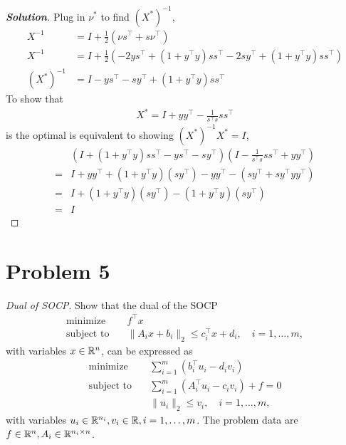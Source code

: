 \documentclass[11pt]{article}
\newenvironment{solution}
  {\renewcommand\qedsymbol{$\square$}\begin{proof}[\textbf{Solution}]}
  {\end{proof}}
\newcommand{\T}{^\top}          %
\begin{document}
\begin{solution}
Plug in $\nu^*$ to find $(X^*)^{-1}$, 
\begin{align*}
    X^{-1} &= I + \frac{1}{2} (\nu s^\top + s \nu^\top) \\
    X^{-1} &= I + \frac{1}{2} \left(-2y s^\top + (1 + y^\top y) s s^\top - 2s y^\top + (1 + y^\top y) s s^\top \right) \\
    (X^*)^{-1} &= 
    I - y s^\top - sy^\top + (1 + y^\top y) s s^\top
\end{align*}
To show that 
\begin{align*}
    X^* = I + yy^\top - \frac{1}{s^\top s} s s^\top
\end{align*}
is the optimal is equivalent to showing $(X^*)^{-1} X^* = I$, 
\begin{align*}
    & \left( I + (1 + y^\top y) s s^\top - y s^\top - sy^\top \right) 
    \left( I - \frac{1}{s^\top s}s s^\top + yy^\top\right) \\
    =& I + yy^\top 
    + (1 + y^\top y) (s y^\top) 
    - y y^\top
    - (sy^\top + s y^\top y y^\top) \\ 
    =& I + (1 + y^\top y) (s y^\top) - (1+ y^\top y )(sy^\top) \\ 
    =& I
\end{align*}

\end{solution}

\clearpage
\section*{Problem 5}
\textit{Dual of SOCP}. Show that the dual of the SOCP
\begin{align*}
  \text{minimize} \quad & f\T x\\
  \text{subject to} \quad & \|A_i x + b_i\|_2 \leq c_i\T x + d_i, \quad i = 1, \dots, m,
\end{align*}
with variables $x\in{{\mathbb{R}}}^n$, can be expressed as 
\begin{align*}
  \text{minimize} \quad & \sum_{i=1}^{m} (b_i\T u_i - d_i v_i)\\
  \text{subject to} \quad & \sum_{i=1}^{m} (A_i\T u_i - c_i v_i) + f = 0\\
  & \|u_i\|_2 \leq v_i, \quad i = 1, \dots, m,
\end{align*}
with variables $u_i\in{{\mathbb{R}}}^{n_i}, v_i\in{{\mathbb{R}}}, i = 1, \dots, m$. The problem data are $f\in{{\mathbb{R}}}^n, A_i\in{{\mathbb{R}}}^{n_i\times n}$.
\end{document}
